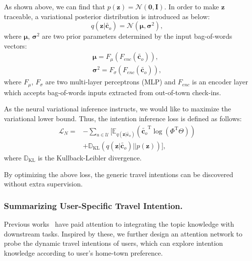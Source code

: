 \documentclass[letterpaper]{article} %
\begin{document}
As shown above, we can find that $p(\mathbf{z}) = \mathcal{N}\left(\mathbf{0}, \mathbf{I}\right)$. In order to make $\mathbf{z}$ traceable, a variational posterior distribution is introduced as below:
%
\begin{equation}\label{e:variational}
    q(\mathbf{z}|\widetilde{\mathbf{c}_o}) =
    \mathcal{N}\left(\bm{\mu},\bm{\sigma}^2 \right) ,
\end{equation}
% 
where $\bm{\mu}$, $\bm{\sigma}^2$ are two prior parameters determined by the input bag-of-words vectors:
%
\begin{equation}\label{e:mu_sigma}
    \begin{split}
        \bm{\mu} = 
        F_{\mu}\left(F_{enc}\left(\widetilde{\mathbf{c}_o}\right)\right)  ,
        \\
        \bm{\sigma}^2 =
        F_{\sigma}\left(F_{enc}\left(\widetilde{\mathbf{c}_o}\right)\right) ,
    \end{split}
\end{equation}
%
where $F_{\mu}$, $F_{\sigma}$ are two multi-layer perceptrons (MLP) and $F_{enc}$ is an encoder layer which accepts bag-of-words inputs extracted from out-of-town check-ins.

As the neural variational inference {instructs}, we would like to maximize the variational lower bound. 
Thus, the intention inference loss is defined as follows:
%
\begin{equation}\label{e:ntm_loss}
    \begin{split}
        \mathcal{L}_N = & - \sum _ {u \in \mathcal{U}} \Big[\mathbb{E}_{q(\mathbf{z}|\widetilde{\mathbf{c}_o})}
        \left(\widetilde{\mathbf{c}_o}^\mathrm{T}
        \log{\left(\Phi^\mathrm{T}\Theta\right)}\right)
        \\
        & + \mathbb{D}_{\mathrm{KL}}
        \left(q\left(\mathbf{z}|\widetilde{\mathbf{c}_o}\right)
        ||p\left(\mathbf{z}\right)\right)\Big] ,
    \end{split}
\end{equation}
%
where $\mathbb{D}_{\mathrm{KL}}$ is the Kullback-Leibler divergence.

By optimizing the above loss, the generic travel intentions can be discovered without extra supervision.


\subsubsection{Summarizing User-Specific Travel Intention.}
Previous works~\cite{zeng2018topic,wei2019modeling} have paid attention to integrating the topic knowledge with downstream tasks. 
Inspired by these, we further design an attention network to probe the  dynamic travel intentions of users, which can explore intention knowledge according to user's home-town preference.
\end{document}
